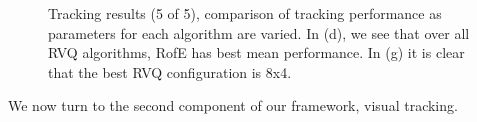 \documentclass{article}
\begin{document}
								\begin{figure}[h!]
								\centering	
								\caption{Tracking results (5 of 5), comparison of tracking performance as parameters for each algorithm are varied.  In (d), we see that over all RVQ algorithms, RofE has best mean performance.  In (g) it is clear that the best RVQ configuration is 8x4.}
								\label{fig:results_final_5_configs}
								\end{figure}

We now turn to the second component of our framework, visual tracking.

\end{document}
